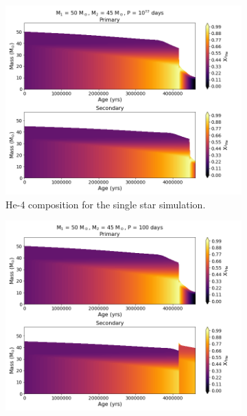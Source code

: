 \begin{figure}
    \begin{subfigure}{\columnwidth}
        \includegraphics[width=\textwidth]{figures/results1/fig_He4_Age_M50_Sin.png}
        \captionsetup{width=.9\columnwidth}
        \caption{He-4 composition for the single star simulation.}
        \label{subfig:50Msol_He4_Sin}
    \end{subfigure}
    \begin{subfigure}{\columnwidth}
        \includegraphics[width=\textwidth]{figures/results1/fig_He4_Age_M50_P100.png}
        \captionsetup{width=.9\columnwidth}

\end{subfigure}
\end{figure}
